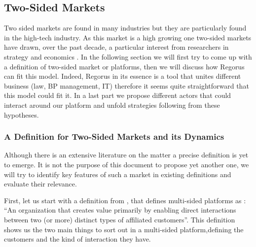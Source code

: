 \documentclass[10pt]{report}
\begin{document}
\subsection{Two-Sided Markets}

Two sided markets are found in many industries but they are particularly found in the high-tech industry. As this market is a high growing one two-sided markets have drawn, over the past decade, a particular interest from researchers in strategy and economics \autocite{Hagiu2011}. In the following section we will first try to come up with a definition of two-sided market or platforms, then we will discuss how Regorus can fit this model. Indeed, Regorus in its essence is a tool that unites different business (law, BP management, IT) therefore it seems quite straightforward that this model could fit it. In a last part we propose different actors that could interact around our platform and unfold strategies following from these hypotheses.

\subsubsection{A Definition for Two-Sided Markets and its Dynamics}

Although there is an extensive literature on the matter a precise definition is yet to emerge. It is not the purpose of this document to propose yet another one, we will try to identify key features of such a market in existing definitions and evaluate their relevance.

First, let us start with a definition from \autocite{Hagiu2011}, that defines multi-sided platforms as : \enquote{An organization that creates value primarily by enabling direct interactions between two (or more) distinct types of affiliated customers}. This definition shows us the two main things to sort out in a multi-sided platform,defining the customers and the kind of interaction they have. 
\end{document}
